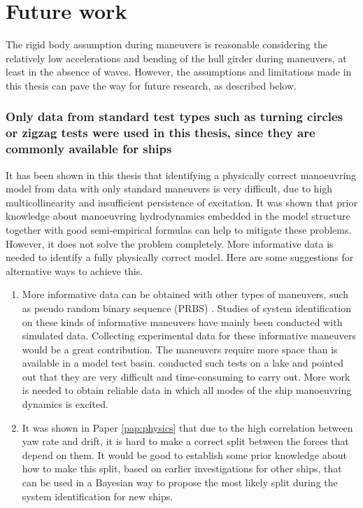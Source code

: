 \chapter{Future work\label{ch:future_work}}

\noindent The rigid body assumption during maneuvers is reasonable considering the relatively low accelerations and bending of the hull girder during maneuvers, at least in the absence of waves. However, the assumptions and limitations made in this thesis can pave the way for future research, as described below.

\subsection*{Only data from standard test types such as turning circles or zigzag tests were used in this thesis, since they are commonly available for ships}
It has been shown in this thesis that identifying a physically correct manoeuvring model from data with only standard maneuvers is very difficult, due to high multicollinearity and insufficient persistence of excitation. 
It was shown that prior knowledge about manoeuvring hydrodynamics embedded in the model structure together with good semi-empirical formulas can help to mitigate these problems.
However, it does not solve the problem completely. More informative data is needed to identify a fully physically correct model. Here are some suggestions for alternative ways to achieve this.
\begin{enumerate}[label=(\roman*),itemsep=1mm]
    
    \item More informative data can be obtained with other types of maneuvers, such as pseudo random binary sequence (PRBS) \cite{yoonIdentificationHydrodynamicCoefficients2003,wangOptimalDesignExcitation2020}. Studies of system identification on these kinds of informative maneuvers have mainly been conducted with simulated data. Collecting experimental data for these informative maneuvers would be a great contribution. The maneuvers require more space than is available in a model test basin. \textcite{millerShipModelIdentification2021} conducted such tests on a lake and pointed out that they are very difficult and time-consuming to carry out. More work is needed to obtain reliable data in which all modes of the ship manoeuvring dynamics is excited.
    
    \item It was shown in Paper \ref{pap:physics} that due to the high correlation between yaw rate and drift, it is hard to make a correct split between the forces that depend on them. It would be good to establish some prior knowledge about how to make this split, based on earlier investigations for other ships, that can be used in a Bayesian way to propose the most likely split during the system identification for new ships.  
        
\end{enumerate}

